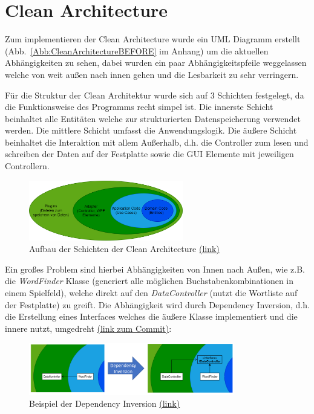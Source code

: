 \chapter{Clean Architecture}

Zum implementieren der Clean Architecture wurde ein UML Diagramm erstellt (Abb.~\ref{Abb:CleanArchitectureBEFORE} im Anhang) um die aktuellen Abhängigkeiten zu sehen, dabei wurden ein paar Abhängigkeitspfeile weggelassen welche von weit außen nach innen gehen und die Lesbarkeit zu sehr verringern. 


Für die Struktur der Clean Architektur wurde sich auf 3 Schichten festgelegt, da die Funktionsweise des Programms recht simpel ist. Die innerste Schicht beinhaltet alle Entitäten welche zur strukturierten Datenspeicherung verwendet werden. Die mittlere Schicht umfasst die Anwendungslogik. Die äußere Schicht beinhaltet die Interaktion mit allem Außerhalb, d.h. die Controller zum lesen und schreiben der Daten auf der Festplatte sowie die GUI Elemente mit jeweiligen Controllern. 


\begin{figure}[!ht]
  \centering
  \includegraphics[width=0.6\textwidth]{Bilder/ArchitekturSchichten.PNG}
  \caption[Aufbau der Schichten der Clean Architecture]{Aufbau der Schichten der Clean Architecture \href{https://github.com/EinToni/WortfinderDoku/blob/main/Bilder/ArchitekturSchichten.png}{(link)}}
  \label{Abb:ArchitekturSchichten}
\end{figure}


Ein großes Problem sind hierbei Abhängigkeiten von Innen nach Außen, wie z.B. die \textit{WordFinder} Klasse (generiert alle möglichen Buchstabenkombinationen in einem Spielfeld), welche direkt auf den \textit{DataController} (nutzt die Wortliste auf der Festplatte) zu greift. Die Abhängigkeit wird durch Dependency Inversion, d.h. die Erstellung eines Interfaces welches die äußere Klasse implementiert und die innere nutzt, umgedreht \href{https://github.com/EinToni/Wortfinder/commit/586681478211a26abc661239ecc2c297ef77041e}{(link zum Commit)}:

\begin{figure}[!ht]
  \centering
  \includegraphics[width=0.8\textwidth]{Bilder/DependencyInversion.PNG}
  \caption[Beispiel der Dependency Inversion]{Beispiel der Dependency Inversion \href{https://github.com/EinToni/WortfinderDoku/blob/main/Bilder/DependencyInversion.png}{(link)}}
  \label{Abb:DependencyInversion}
\end{figure}

